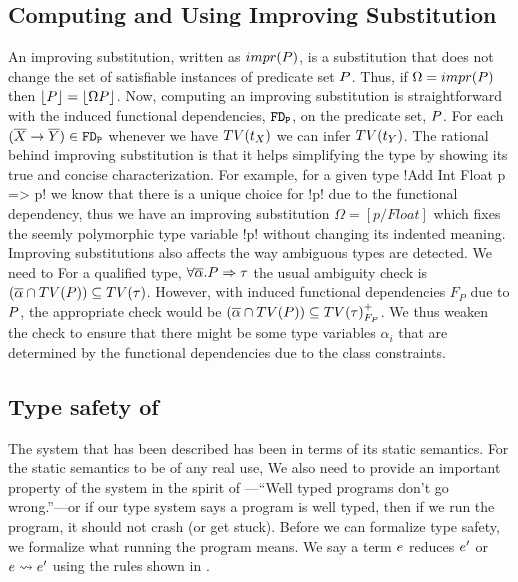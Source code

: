 \documentclass[format=sigplan,manuscript,review,screen,nonacm,margin=1in]{acmart}
\begin{document}
\subsection{Computing and Using Improving Substitution}\label{subsec:fd-improve}
An improving substitution, written as $impr(P)$, is a substitution that does not change the set of
satisfiable instances of predicate set $P$.
Thus, if $\Omega = impr(P)$ then $\lfloor P\rfloor = \lfloor\Omega P\rfloor$. Now, computing
an improving substitution is straightforward with the induced functional
dependencies, $\texttt{FD}_\texttt{P}$, on the predicate set, $P$.
For each $(\overline{X} \to \overline{Y})\in\texttt{FD}_\texttt{P}$
whenever we have $TV(t_X)$ we can infer $TV(t_Y)$. The rational behind
improving substitution is that it helps simplifying the type by showing its true
and concise characterization. For example, for a given type !Add Int Float p => p!
we know that there is a unique choice for !p! due to the functional dependency,
thus we have an improving substitution $\Omega = [p/Float]$ which
fixes the seemly polymorphic type variable !p! without changing its indented meaning.
Improving substitutions also affects the way ambiguous types are detected. We need to
For a qualified type, $\forall\overline{\alpha}.P\Rightarrow\tau$ the usual ambiguity
check is $(\overline{\alpha}\cap TV(P)) \subseteq TV(\tau)$. However, with induced functional dependencies $F_P$
due to $P$, the appropriate check would be $(\overline{\alpha}\cap TV(P)) \subseteq {TV(\tau)}^{+}_{F_P}$.
We thus weaken the check to ensure that there might be some type variables $\alpha_i$ that are determined by the
functional dependencies due to the class constraints.

\subsection{Type safety of \TCFD{}}\label{subsec:tcfd-safety}
The system that has been described has been in terms of its static semantics.
For the static semantics to be of any real use, We also need to provide an important property
of the system in the spirit of \cite{milner_theory_1978}---``Well typed programs
don't go wrong.''---or if our type system says a program is well typed, then if we run the program,
it should not crash (or get stuck). Before we can formalize type safety, we formalize
what running the program means. We say a term $e$ reduces $e'$ or $e \rightsquigarrow e'$
using the rules shown in .
\newcommand\AppR{
  \ib{\irule[\trule{s-app}]
    {\stepsto {\Tm_1} {\Tm'_1}};
    {\stepsto {\Tm_1\App\Tm_2} {\Tm'_1\App\Tm_2}}}
}
\newcommand\BetaR{
  \ib{\irule[\trule{s-$\beta$}];
    {\stepsto {(\Lam x \tau \Tm_1)\App\Tm_2} {\Tm_1[x/\Tm_2]}}
  }
}
\end{document}
